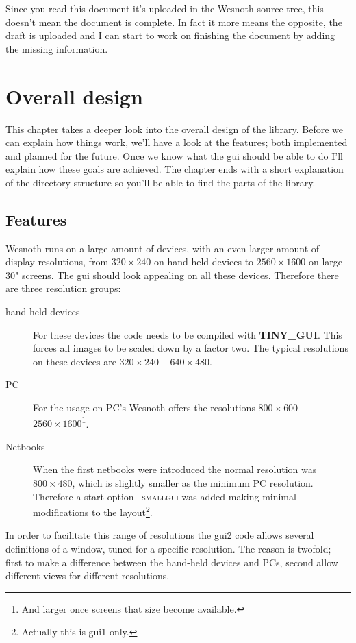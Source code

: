 \documentclass[a4paper,notitlepage]{report}
\begin{document}
Since you read this document it's uploaded in the Wesnoth source tree, this
doesn't mean the document is complete. In fact it more means the opposite, the
draft is uploaded and I can start to work on finishing the document by adding
the missing information.


\chapter{Overall design}

This chapter takes a deeper look into the overall design of the library. Before
we can explain how things work, we'll have a look at the features; both
implemented and planned for the future. Once we know what the gui should be able
to do I'll explain how these goals are achieved. The chapter ends with a short
explanation of the directory structure so you'll be able to find the parts of
the library.

\section{Features}

Wesnoth runs on a large amount of devices, with an even larger amount of display
resolutions, from $320\times 240$ on hand-held devices to $2560\times 1600$ on
large 30" screens. The gui should look appealing on all these devices. Therefore
there are three resolution groups:
\begin{description}
\item[hand-held devices] For these devices the code needs to be compiled with
\textbf{TINY\_GUI}. This forces all images to be scaled down by a factor two.
	The typical resolutions on these devices are $320\times 240$ -- $640\times
	480$.
\item[PC] For the usage on PC's Wesnoth offers the resolutions $800\times 600$
	-- $2560\times 1600$\footnote{And larger once screens that size become
	available.}.
\item[Netbooks] When the first netbooks were introduced the normal resolution
	was $800\times 480$, which is slightly smaller as the minimum PC resolution.
	Therefore a start option \textsc{--smallgui} was added making minimal
	modifications to the layout\footnote{Actually this is gui1 only.}.
\end{description}

In order to facilitate this range of resolutions the gui2 code allows several
definitions of a window, tuned for a specific resolution. The reason is twofold;
first to make a difference between the hand-held devices and PCs, second allow
different views for different resolutions.
\end{document}
